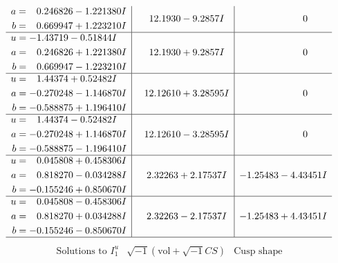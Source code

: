 \documentclass[1p]{elsarticle_modified}
\theoremstyle{definition}
\newcommand{\I}{\sqrt{-1}}
\begin{document}
$$\begin{array}{c|c|c}
\begin{aligned}
a &= \phantom{-}0.246826 - 1.221380 I \\
b &= \phantom{-}0.669947 + 1.223210 I\end{aligned}
 & \phantom{-}12.1930 - 9.2857 I & \phantom{-0.000000 } 0 \\ \hline\begin{aligned}
u &= -1.43719 - 0.51844 I \\
a &= \phantom{-}0.246826 + 1.221380 I \\
b &= \phantom{-}0.669947 - 1.223210 I\end{aligned}
 & \phantom{-}12.1930 + 9.2857 I & \phantom{-0.000000 } 0 \\ \hline\begin{aligned}
u &= \phantom{-}1.44374 + 0.52482 I \\
a &= -0.270248 - 1.146870 I \\
b &= -0.588875 + 1.196410 I\end{aligned}
 & \phantom{-}12.12610 + 3.28595 I & \phantom{-0.000000 } 0 \\ \hline\begin{aligned}
u &= \phantom{-}1.44374 - 0.52482 I \\
a &= -0.270248 + 1.146870 I \\
b &= -0.588875 - 1.196410 I\end{aligned}
 & \phantom{-}12.12610 - 3.28595 I & \phantom{-0.000000 } 0 \\ \hline\begin{aligned}
u &= \phantom{-}0.045808 + 0.458306 I \\
a &= \phantom{-}0.818270 - 0.034288 I \\
b &= -0.155246 + 0.850670 I\end{aligned}
 & \phantom{-}2.32263 + 2.17537 I & -1.25483 - 4.43451 I \\ \hline\begin{aligned}
u &= \phantom{-}0.045808 - 0.458306 I \\
a &= \phantom{-}0.818270 + 0.034288 I \\
b &= -0.155246 - 0.850670 I\end{aligned}
 & \phantom{-}2.32263 - 2.17537 I & -1.25483 + 4.43451 I\\
 \hline 
 \end{array}$$\newpage$$\begin{array}{c|c|c}  
\text{Solutions to }I^u_{1}& \I (\text{vol} + \sqrt{-1}CS) & \text{Cusp shape}\\
 \hline 
\begin{aligned}

\end{aligned}
\end{array}$$
\end{document}
